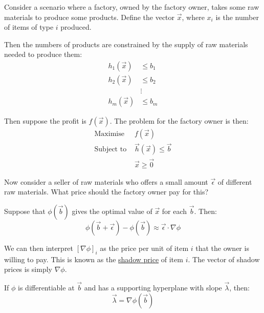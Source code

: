 \documentclass[../Main.tex]{subfiles}
\begin{document}
\begin{example}
    Consider a scenario where a factory, owned by the factory owner, takes some raw materials to produce some products. Define the vector $\vec{x}$, where $x_i$ is the number of items of type $i$ produced.

    Then the numbers of products are constrained by the supply of raw materials needed to produce them:
    \begin{align*}
        h_1(\vec{x}) &\leq b_1 \\
        h_2(\vec{x}) &\leq b_2 \\
        &\vdots \\
        h_m(\vec{x}) &\leq b_m
    \end{align*}

    Then suppose the profit is $f(\vec{x})$. The problem for the factory owner is then:
    \begin{align*}
        \text{Maximise } &f(\vec{x}) \\
        \text{Subject to } &\vec{h}(\vec{x}) \leq \vec{b} \\
        &\vec{x} \geq \vec{0}
    \end{align*}

    Now consider a seller of raw materials who offers a small amount $\vec{\epsilon}$ of different raw materials. What price should the factory owner pay for this?

    Suppose that $\phi(\vec{b})$ gives the optimal value of $\vec{x}$ for each $\vec{b}$. Then:
    \begin{equation*}
        \phi(\vec{b} + \vec{\epsilon}) - \phi(\vec{b}) \approx \vec{\epsilon} \cdot \nabla \phi
    \end{equation*}

    We can then interpret $[\nabla \phi]_i$ as the price per unit of item $i$ that the owner is willing to pay. This is known as the \underline{shadow price} of item $i$. The vector of shadow prices is simply $\nabla \phi$.
\end{example}
\begin{theorem}
    If $\phi$ is differentiable at $\vec{b}$ and has a supporting hyperplane with slope $\vec{\lambda}$, then:
    \begin{equation*}
        \vec{\lambda} = \nabla \phi(\vec{b})
    \end{equation*}
\end{theorem}
\end{document}
